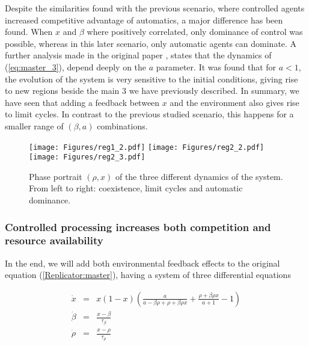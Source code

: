 \documentclass[10pt,a4paper]{article}
\begin{document}
Despite the similarities found with the previous scenario, where controlled agents increased competitive advantage of automatics, a major difference has been found. When $x$ and
$\beta$ where positively correlated, only dominance of control was possible, whereas in this later scenario, only automatic agents can dominate. A further analysis made 
in the original paper \cite{Strogatz:evolutionary}, states that the dynamics of (\ref{eq:master_3}), depend deeply on the $a$ parameter. It was found that for $a<1$, 
the evolution of the system is very sensitive to the initial conditions, giving rise to new regions beside the main 3 we have previously described. In summary, we have seen
that adding a feedback between $x$ and the environment also gives rise to limit cycles. In contrast to the previous studied scenario, this happens for a smaller
range of $(\beta,a)$  combinations.

\begin{figure}[h!]
\centering
\texttt{[image: Figures/reg1\_2.pdf]}
\texttt{[image: Figures/reg2\_2.pdf]}
\texttt{[image: Figures/reg2\_3.pdf]}
\vspace{-0.4cm}
\caption{Phase portrait $(\rho,x)$ of the three different dynamics of the system. From left to right: coexistence, limit cycles and automatic dominance.}
\label{fig:portrait_3}
\end{figure}

\subsubsection{Controlled processing increases both competition and resource availability}

In the end, we will add both environmental feedback effects to the original equation (\ref{Replicator:master}), having a system of three differential equations

\begin{equation}
\begin{array}{lcl}
\dot{x} & = & x(1-x)\displaystyle\left( \frac{a}{a-\beta\rho+\rho+\beta\rho x} + \frac{\rho+\beta\rho x}{a+1} -1 \right)\\
\dot{\beta} & = & \displaystyle\frac{x-\beta}{\tau_{\beta}}\\
\dot{\rho} & = & \displaystyle\frac{x-\rho}{\tau_{\rho}}
\end{array}
\label{eq:master_4}
\end{equation}
\end{document}
